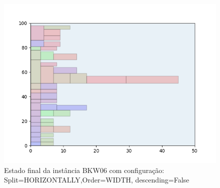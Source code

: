 \begin{figure}[H]
    \centering
    \caption[]{Estado final da instância BKW06 com configuração: Split=HORIZONTALLY,Order=WIDTH, descending=False}
    \label{fig:bkw06-horizontally-width-false}
    \includegraphics[scale=0.5]{output/figures/bkw/bkw06/horizontally/width/false/00}
\end{figure}